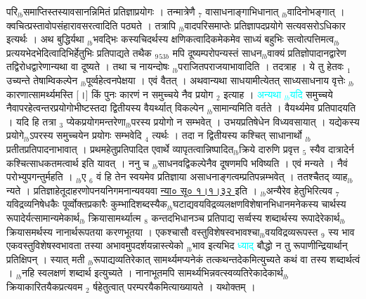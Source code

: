 \documentclass[article,12pt,a4paper]{memoir}%
\newcommand{\quotelemma}[1]{\textcolor{cyan}{#1}}
\begin{document}
परि{\tiny $_{lb}$}समाप्तिस्तस्यावसानन्निमितं प्रतिज्ञाप्रयोगः । तन्मात्रेणै {\tiny $_{7}$} वासाधनाङ्गाभिधानात् {\tiny $_{lb}$}वादिनोभङ्गात् । क्वचित्प्रस्तावोपसंहारावसरत्वादिति पठ्यते । तत्रापि {\tiny $_{lb}$}वादपरिसमाप्तेः प्रतिज्ञापदप्रयोगे सत्यवसरोऽधिकार इत्यर्थः । अथ बुद्धिर्यथा {\tiny $_{lb}$}भवद्भिः कस्यचिदर्थस्य क्षणिकत्वादिकमेकमेव साध्यं बहुभिः सत्वोत्पत्तिमत्व{\tiny $_{lb}$}प्रत्ययभेदभेदित्वादिभिर्हेतुभिः प्रतिपाद्यते तथैक {\tiny $_{9}$}{\tiny $_{53b}$} मपि दूष्यम्परोपन्यस्तं साधन{\tiny $_{lb}$}वाक्यं प्रतिज्ञोपादानद्वारेण तद्विरोधद्वारेणान्यथा वा दूष्यते । तथा च नायन्दोषः {\tiny $_{lb}$}पराजितपराजयाभावादिति । तदत्राह । ये तु हेतवः {\tiny $_{1}$} उच्यन्ते \cite[10b2]{vn-msN} तेषाम्विकल्पेन {\tiny $_{lb}$}पूर्व्वहेत्वनपेक्षया । एवं वैतत् । अथवान्यथा साधयामीत्येतत् साध्यसाधनाय वृत्तेः {\tiny $_{lb}$}कारणात्सामर्थ्यमस्ति [।] किं पुनः कारणं न समुच्चये नैव प्रयोग {\tiny $_{2}$} इत्याह । \quotelemma{अन्यथा {\tiny $_{lb}$}यदि} \cite[10b3]{vn-msN} समुच्चये नैवापरहेत्वन्तरप्रयोगोभीष्टस्तदा द्वितीयस्य वैयर्थ्यात् विकल्पेन {\tiny $_{lb}$}सामान्यमिति वर्तते । वैयर्थ्यमेव प्रतिपादयति । यदि हि तत्रा {\tiny $_{3}$} प्येकप्रयोगमन्तरेणा{\tiny $_{lb}$}परस्य प्रयोगो न सम्भवेत् । उभयप्रतिषेधेन विध्यवसायात् । यद्येकस्य प्रयोगे{\tiny $_{lb}$}ऽपरस्य समुच्चयेन प्रयोगः सम्भवेदि {\tiny $_{4}$} त्यर्थः । तदा न द्वितीयस्य कश्चित् साधानार्थो {\tiny $_{lb}$}प्रतीतप्रतिपादनाभावात् । प्रथमहेतुप्रतिपादित एवार्थे व्यापृतत्वान्निष्पादित{\tiny $_{lb}$}क्रिये दारुणि प्रवृत्त {\tiny $_{5}$} स्यैव दात्रादेर्न कश्चित्साधकतमत्वार्थ इति यावत् । ननु च {\tiny $_{lb}$}साधनवद्विकल्पेनैव दूषणमपि भविष्यति । एवं मन्यते । नैवं परोभ्युपगन्तुर्महति । {\tiny $_{lb}$}ए {\tiny $_{6}$} वं हि तेन स्वयमेव प्रतिज्ञाया असाधनाङ्गत्वम्प्रतिपन्नम्भवेत् । ततश्चैतद् व्याह{\tiny $_{lb}$}न्यते । प्रतिज्ञाहेतूदाहरणोपनयनिगमनान्यवयवा \href{http://sarit.indology.info/?cref=ns\%C5\%AB.1.1.32}{न्या० सू० १।१।३२ } इति । {\tiny $_{lb}$}अन्यैरेव हेतुभिरित्यव {\tiny $_{7}$} यविद्रव्यनिषेधकैः पूर्व्वोक्तप्रकारैः कुम्भादिशब्दस्यैक{\tiny $_{lb}$}घटाद्यवयविद्रव्यलक्षणविशेषानभिधानमनेकस्य चार्थस्य रूपादेर्यत्सामान्यमेकार्थ{\tiny $_{lb}$} \leavevmode{} क्रियासामर्थ्यात्म {\tiny $_{8}$} कन्तदभिधानञ्च प्रतिपाद्य सर्व्वस्य शब्दार्थस्य रूपादेरेकार्थ{\tiny $_{lb}$}क्रियासमर्थस्य नानार्थरूपतया करणभूतया । एकश्चासौ वस्तुविशेषस्वभावश्चा{\tiny $_{lb}$}वयविद्रव्यरूपस्त {\tiny $_{9}$} \leavevmode{} स्य भाव एकवस्तुविशेषस्वभावता तस्या अभावमुपदर्शयन्नास्त्येको {\tiny $_{lb}$}भाव इत्यभिद \quotelemma{ध्याद्} बौद्धो न तु रूपाणीन्द्रियार्थान् प्रतिक्षिपन् । स्यात् मती {\tiny $_{lb}$}रूपाद्यव्यतिरेकात् सामर्थ्यमप्यनेकं तत्कथन्तदेकमित्युच्यते कथं वा तस्य शब्दार्थत्वं । {\tiny $_{lb}$}नहि स्वलक्षणं शब्दार्थ इत्युच्यते । नानाभूतमपि सामर्थ्यभिन्नवत्स्वव्यतिरेकादेकार्थ{\tiny $_{lb}$}क्रियाकारितयैकप्रत्यवम {\tiny $_{2}$} र्षहेतुत्वात् परम्परयैकमित्याख्यायते । यथोक्तम् ।
\end{document}
